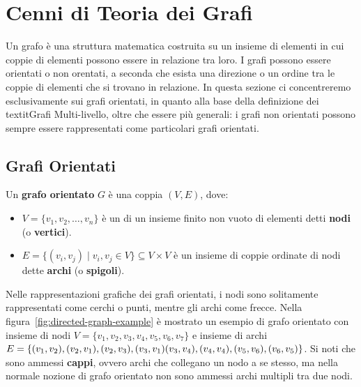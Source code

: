 \section{Cenni di Teoria dei Grafi}\label{sec:cenni-di-teoria-dei-grafi}

Un grafo \`e una struttura matematica costruita su un insieme di elementi in cui coppie di elementi possono essere
in relazione tra loro.
I grafi possono essere orientati o non orentati, a seconda che esista una direzione o un ordine tra le coppie
di elementi che si trovano in relazione.
In questa sezione ci concentreremo esclusivamente sui grafi orientati, in quanto alla base della definizione dei
textit{Grafi Multi-livello}, oltre che essere più generali: i grafi non orientati possono sempre essere rappresentati
come particolari grafi orientati.

\subsection{Grafi Orientati}\label{subsec:grafi-orientati}

\begin{definition}
    Un \textbf{grafo orientato} $G$ \`e una coppia $(V, E)$, dove:
    \begin{itemize}
        \item $V  = \{v_1, v_2, \ldots, v_n\}$ \`e un di un insieme finito non vuoto di elementi detti \textbf{nodi}
        (o \textbf{vertici}).
        \item $E = \{(v_i, v_j) \mid v_i, v_j \in V\} \subseteq V \times V$ \`e un insieme di coppie ordinate di
        nodi dette \textbf{archi} (o \textbf{spigoli}).
    \end{itemize}
\end{definition}

Nelle rappresentazioni grafiche dei grafi orientati, i nodi sono solitamente rappresentati
come cerchi o punti, mentre gli archi come frecce.
Nella figura~\ref{fig:directed-graph-example} \`e mostrato un esempio di grafo orientato con insieme di nodi
$V = \{v_1, v_2, v_3, v_4, v_5, v_6, v_7\}$ e insieme di archi $E = \{(v_1, v_2), (v_2, v_1), (v_2, v_3), (v_3, v_1)
(v_3, v_4), \\ (v_4, v_4), (v_5, v_6), (v_6, v_5)\}$. \newline
Si noti che sono ammessi \textbf{cappi}, ovvero archi che collegano un nodo a se stesso, ma nella normale nozione
di grafo orientato non sono ammessi archi multipli tra due nodi.

